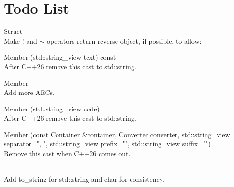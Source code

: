 \chapter{Todo List}
\hypertarget{todo}{}\label{todo}

\begin{DoxyRefList}
\item[Struct \doxylink{structauspicious__library_1_1aec_1_1aec__t}{auspicious\+\_\+library\+::aec\+::aec\+\_\+t} ]\hfill \\
\label{todo__todo000002}%
%
Make ! and \texorpdfstring{$\sim$}{\string~} operators return reverse object, if possible, to allow\+:  
\item[Member \doxylink{structauspicious__library_1_1aec_1_1aec__t_ac7c8650fe2525de9bbeea55c478b74a9}{auspicious\+\_\+library\+::aec\+::aec\+\_\+t\+::operator()} (std\+::string\+\_\+view text) const]\hfill \\
\label{todo__todo000004}%
%
After C++26 remove this cast to std\+::string.  
\item[Member \doxylink{namespaceauspicious__library_1_1aec_af8881b9d6d857581a4e1c5f7b482d715}{auspicious\+\_\+library\+::aec\+::reset} ]\hfill \\
\label{todo__todo000003}%
%
Add more AECs.  
\item[Member \doxylink{namespaceauspicious__library_1_1aec_aa1ee086ed35c793b0ca65b04e20eddf6}{auspicious\+\_\+library\+::aec\+::sgr} (std\+::string\+\_\+view code)]\hfill \\
\label{todo__todo000001}%
%
After C++26 remove this cast to std\+::string.  
\item[Member \doxylink{namespaceauspicious__library_1_1sm_a6ba949956dc793812eacde5acc12fe8a}{auspicious\+\_\+library\+::sm\+::to\+\_\+string} (const Container \&container, Converter converter, std\+::string\+\_\+view separator="{}, "{}, std\+::string\+\_\+view prefix="{}"{}, std\+::string\+\_\+view suffix="{}"{})]\hfill \\
\label{todo__todo000005}%
%
Remove this cast when C++26 comes out.  
\item[Member \doxylink{namespaceauspicious__library_1_1sm_a557e590ecf315060dbbe49015d5e90fb}{auspicious\+\_\+library\+::sm\+::word\+\_\+wrap} (std\+::string\+\_\+view string, std\+::size\+\_\+t width, bool force=false, std\+::string\+\_\+view delims="{} \textbackslash{}\textbackslash{}t\textbackslash{}\textbackslash{}r\textbackslash{}\textbackslash{}n\textbackslash{}\textbackslash{}f\textbackslash{}\textbackslash{}v\textbackslash{}\textbackslash{}b"{})]\hfill \\
\label{todo__todo000006}%
%
Add to\+\_\+string for std\+::string and char for consistency. 
\end{DoxyRefList}